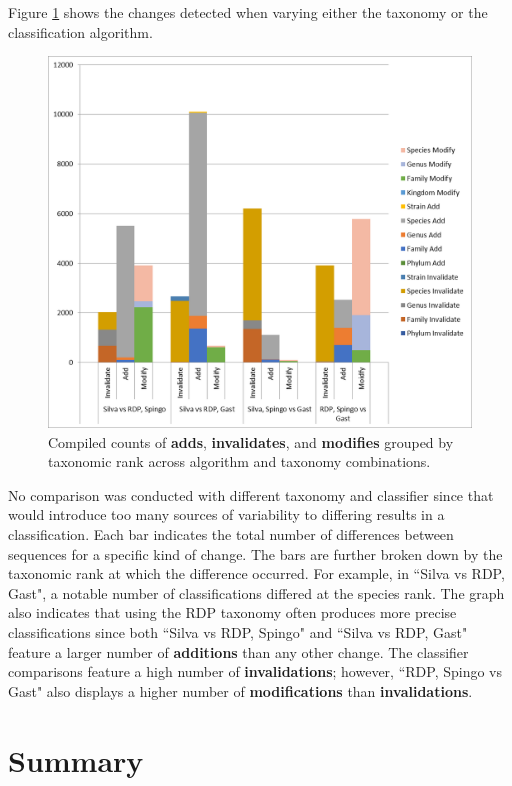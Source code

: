 Figure \ref{mbvl_chart} shows the changes detected when varying either the taxonomy or the classification algorithm.
\begin{figure}
	\centering
	\includegraphics[scale=0.80]{figures/mbvl_chart.png}
	\caption{Compiled counts of \textbf{adds}, \textbf{invalidates}, and \textbf{modifies} grouped by taxonomic rank across algorithm and taxonomy combinations.}
	\label{mbvl_chart}
\end{figure}
No comparison was conducted with different taxonomy and classifier since that would introduce too many sources of variability to differing results in a classification.
Each bar indicates the total number of differences between sequences for a specific kind of change.
The bars are further broken down by the taxonomic rank at which the difference occurred.
For example, in ``Silva vs RDP, Gast", a notable number of classifications differed at the species rank.
The graph also indicates that using the RDP taxonomy often produces more precise classifications since both ``Silva vs RDP, Spingo" and ``Silva vs RDP, Gast" feature a larger number of \textbf{additions} than any other change.
The classifier comparisons feature a high number of \textbf{invalidations}; however, ``RDP, Spingo vs Gast" also displays a higher number of \textbf{modifications} than \textbf{invalidations}.


\section{Summary}

